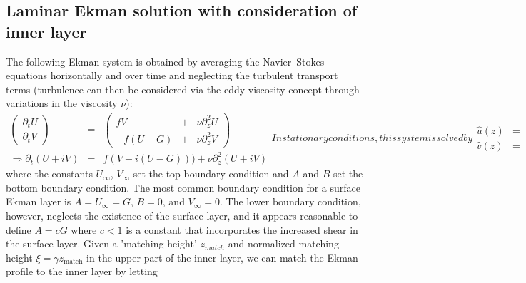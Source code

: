 \documentclass[smallcondensed,final]{svjour3}
\newcommand{\p}{\partial}
\begin{document}
\subsection{Laminar Ekman solution with consideration of inner layer}
\label{app:ekman_solution}
The following Ekman system is obtained by averaging the Navier--Stokes equations horizontally and over time and neglecting the turbulent transport terms (turbulence can then be considered via the eddy-viscosity concept through variations in the viscosity $\nu$):
\begin{subequations}
\begin{eqnarray}
  \left(\begin{matrix}
    \p_t U\\
    \p_t V  
  \end{matrix}\right)&=&\left(\begin{matrix}
     fV &+& \nu \p_z^2 U\\ 
    -f(U-G) &+& \nu \p_z^2 V
  \end{matrix}\right)\\ 
  \Rightarrow \partial_t (U+iV) &=& f(V-i(U-G))) + \nu \p_z^2(U+iV)
\end{eqnarray}
In stationary conditions, this system is solved by
\begin{eqnarray}
  \hat{u}(z) &=& U_{\infty} + e^{-\gamma z} \left[A \cos\gamma z + B \sin\gamma z\right]   \\
  \hat{v}(z) &=& V_{\infty} + e^{-\gamma z} \left[-A \sin\gamma z + B \cos\gamma z\right]
\end{eqnarray} 
\end{subequations}
where the constants $U_\infty$, $V_\infty$ set the top boundary condition and $A$ and $B$ set the bottom boundary condition. 
%
The most common boundary condition for a surface Ekman layer is $A=U_{\infty}=G$, $B=0$, and $V_{\infty}=0$.
%
The lower boundary condition, however, neglects the existence of the surface layer, and it appears reasonable to define
$A=c G$ where $c<1$ is a constant that incorporates the increased shear in the surface layer.
%
Given a 'matching height' $z_{match}$ and normalized matching height $\xi=\gamma z_\text{match}$ in the upper part of the inner layer, we can match the Ekman profile
to the inner layer by letting
%
\end{document}
